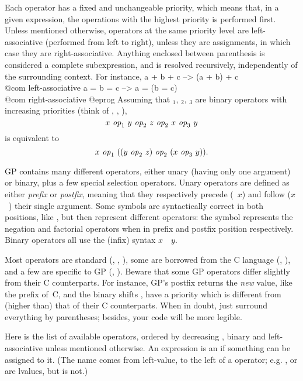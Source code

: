 Each operator has a fixed and unchangeable priority, which means that, in
a given expression, the operations with the highest priority is performed
first. Unless mentioned otherwise, operators at the same priority level are
left-associative (performed from left to right), unless they are assignments,
in which case they are right-associative. Anything enclosed between
parenthesis is considered a complete subexpression, and is resolved
recursively, independently of the surrounding context. For instance,
\bprog
  a + b + c    -->   (a + b) + c     \\@com left-associative
  a = b = c    -->   a = (b = c)     \\@com right-associative
@eprog\noindent
Assuming that $_1$, $_2$, $_3$ are
binary operators with increasing priorities (think of \kbd{+},
\kbd{*}, \kbd{\pow}),
$$ x~\hbox{\it op\/}_1~y~\hbox{\it op\/}_2~z~\hbox{\it op\/}_2~x~\hbox{\it op\/}_3~y $$ is
equivalent to $$ x~\hbox{\it op\/}_1~((y~\hbox{\it op\/}_2~z)~\hbox{\it op\/}_2~
(x~\hbox{\it op\/}_3~y)).$$

GP contains many different operators, either unary (having only
one argument) or binary, plus a few special selection operators. Unary
operators are defined as either \emph{prefix}  or \emph{postfix}, meaning
that they respectively precede (~$x$) and follow ($x$~) their
single argument. Some symbols are syntactically correct in both positions,
like \kbd{!}, but then represent different operators: the \kbd{!} symbol
represents the negation and factorial operators when in prefix and postfix
position respectively. Binary operators all use the (infix) syntax
$x$~~$y$.

Most operators are standard (\kbd{+}, \kbd{\%}, \kbd{=}), some are
borrowed from the C language (\kbd{++}, \kbd{<<}), and a few are
specific to GP (\kbd{\bs}, \kbd{\#}). Beware that some GP operators differ
slightly from their C counterparts. For instance, GP's postfix \kbd{++}
returns the \emph{new} value, like the prefix \kbd{++} of~C, and the binary
shifts \kbd{<<}, \kbd{>>} have a priority which is different from (higher
than) that of their C counterparts. When in doubt, just surround everything
by parentheses; besides, your code will be more legible.

\noindent Here is the list of available operators, ordered by decreasing
, binary and left-associative unless mentioned otherwise. An
expression is an  if something can be assigned to it. (The name
comes from left-value, to the left of a \kbd{=} operator; e.g.
, or  are lvalues, but  is not.)

